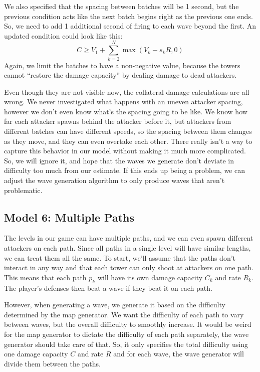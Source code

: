 We also specified that the spacing between batches will be 1 second, but the previous condition acts like the next batch begins right as the previous one ends.
So, we need to add 1 additional second of firing to each wave beyond the first.
An updated condition could look like this:
\begin{equation}
    C \geq V_1 +\sum_{k=2}^{N} \max(V_k - s_kR, 0)
\end{equation}
Again, we limit the batches to have a non-negative value, because the towers cannot \enquote{restore the damage capacity} by dealing damage to dead attackers.

Even though they are not visible now, the collateral damage calculations are all wrong.
We never investigated what happens with an uneven attacker spacing, however we don't even know what's the spacing going to be like.
We know how far each attacker spawns behind the attacker before it, but attackers from different batches can have different speeds, so the spacing between them changes as they move, and they can even overtake each other.
There really isn't a way to capture this behavior in our model without making it much more complicated.
So, we will ignore it, and hope that the waves we generate don't deviate in difficulty too much from our estimate.
If this ends up being a problem, we can adjust the wave generation algorithm to only produce waves that aren't problematic.

\subsection{Model 6: Multiple Paths}\label{sec:analysis-waves-paths}
The levels in our game can have multiple paths, and we can even spawn different attackers on each path.
Since all paths in a single level will have similar lengths, we can treat them all the same.
To start, we'll assume that the paths don't interact in any way and that each tower can only shoot at attackers on one path.
This means that each path $p_k$ will have its own damage capacity $C_k$ and rate $R_k$.
The player's defenses then beat a wave if they beat it on each path.

However, when generating a wave, we generate it based on the difficulty determined by the map generator.
We want the difficulty of each path to vary between waves, but the overall difficulty to smoothly increase.
It would be weird for the map generator to dictate the difficulty of each path separately, the wave generator should take care of that.
So, it only specifies the total difficulty using one damage capacity $C$ and rate $R$ and for each wave, the wave generator will divide them between the paths.

